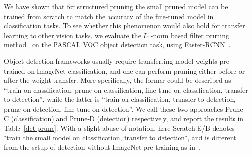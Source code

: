 We have shown that for structured pruning the small pruned model can be trained from scratch to match the accuracy of the fine-tuned model in classification tasks. To see whether this phenomenon would also hold for transfer learning to other vision tasks, we evaluate the $L_1$-norm based filter pruning method~\cite{li2016pruning} on the PASCAL VOC object detection task, using Faster-RCNN~\cite{Ren2015}. 

Object detection frameworks usually require transferring model weights pre-trained on ImageNet classification, and one can perform pruning either before or after the weight transfer. More specifically, the former could be described as ``train on classification, prune on classification, fine-tune on classification, transfer to detection'', while the latter is ``train on classification, transfer to detection, prune on detection, fine-tune on detection''. We call these two approaches Prune-C (classification) and Prune-D (detection) respectively, and report the results in Table~\ref{det-prune}. With a slight abuse of notation, here Scratch-E/B denotes "train the small model on classification, transfer to detection", and is different from the setup of detection without ImageNet pre-training as in~\cite{dsod}.

\begin{table}[ht]
\begin{minipage}{\linewidth}
\centering
\small
\label{det-prune}
\end{minipage}\hfill
\end{table}


